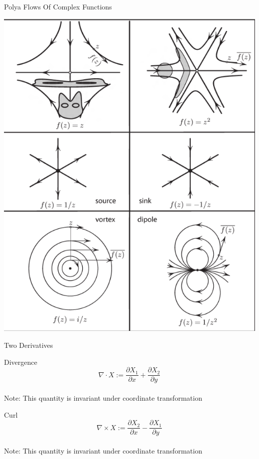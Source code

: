 \documentclass[9pt]{beamer}
\begin{document}
\begin{frame}{Polya Flows Of Complex Functions}
  \begin{center}
    \includegraphics[scale=0.25]{flows.png}
  \end{center}
\end{frame}

\begin{frame}{Two Derivatives}
  \begin{block}{Divergence}
    $$\nabla\cdot X:=\frac{\partial X_1}{\partial x}+\frac{\partial X_2}{\partial y}$$\\
    Note: This quantity is invariant under coordinate transformation
  \end{block}
  \pause
  \begin{block}{Curl}
    $$\nabla\times X:=\frac{\partial X_2}{\partial x}-\frac{\partial X_1}{\partial y}$$\\
    Note: This quantity is invariant under coordinate transformation
  \end{block}
\end{frame}
\end{document}

